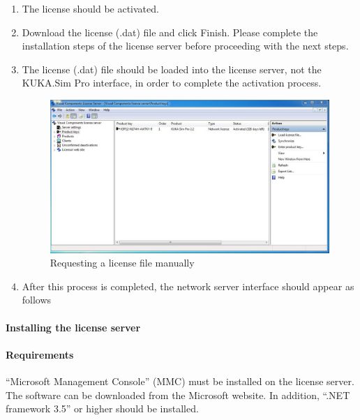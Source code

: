 \begin{enumerate}
					\item The license should be activated.
					\item Download the license (.dat) file and click Finish. Please complete the installation steps of the license server before proceeding with the next steps.
					\item The license (.dat) file should be loaded into the license server, not the KUKA.Sim Pro interface, in order to complete the activation process. 
\begin{figure}[H]
    \centering
    \includegraphics[width=\textwidth]{figures/simpro3}
    \caption{Requesting a license file manually}
    \label{fig:simpro3}
\end{figure}

					\item After this process is completed, the network server interface should appear as follows
				\end{enumerate}
			
			\paragraph{Installing the license server}
			\paragraph{Requirements}
			“Microsoft Management Console” (MMC) must be installed on the license server. The software can be downloaded from the Microsoft website. In addition, “.NET framework 3.5” or higher should be installed. 
			

